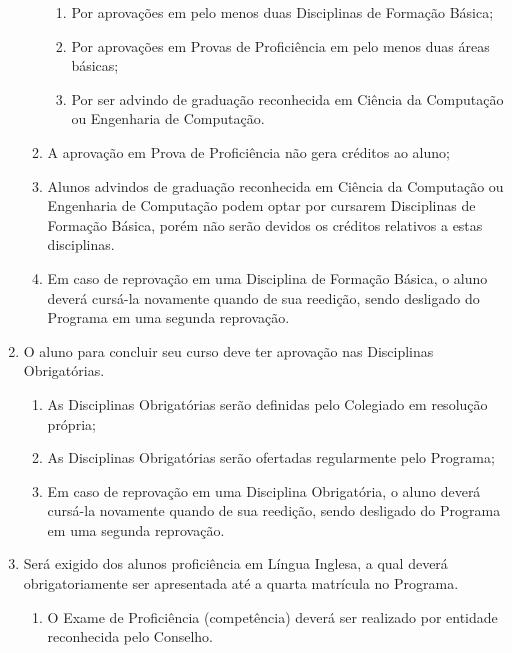 \documentclass{article}
\newcommand{\singleitem}{\item[Parágrafo Único.]}
\newcommand{\grupoMenor}{Colegiado\xspace}
\newcommand{\grupoMaior}{Conselho\xspace}
\begin{document}
\begin{enumerate}
\begin{enumerate}
		\begin{enumerate}[label=\Roman*]
			\item Por aprovações em pelo menos duas Disciplinas de Formação Básica;
			\item Por aprovações em Provas de Proficiência em pelo menos duas áreas básicas; 
			\item Por ser advindo de graduação reconhecida em Ciência da Computação ou Engenharia de Computação.
		\end{enumerate}

		\item A aprovação em Prova de Proficiência não gera créditos ao aluno;

		\item Alunos advindos de graduação reconhecida em Ciência da Computação ou Engenharia de Computação podem optar por cursarem Disciplinas de Formação Básica, porém não serão devidos os créditos relativos a estas disciplinas.

		\item Em caso de reprovação em uma Disciplina de Formação Básica, o aluno deverá cursá-la novamente quando de sua reedição, sendo desligado do Programa em uma segunda reprovação.
	\end{enumerate}

	\item O aluno para concluir seu curso deve ter aprovação nas Disciplinas Obrigatórias.
	\begin{enumerate}
		\item As Disciplinas Obrigatórias serão definidas pelo \grupoMenor em resolução própria;
		\item As Disciplinas Obrigatórias serão ofertadas regularmente pelo Programa;
		\item Em caso de reprovação em uma Disciplina Obrigatória, o aluno deverá cursá-la novamente quando de sua reedição, sendo desligado do Programa em uma segunda reprovação.
	\end{enumerate}

	\item Será exigido dos alunos proficiência em Língua Inglesa, a qual deverá obrigatoriamente ser apresentada até a quarta matrícula no Programa.
	\begin{enumerate}
		\singleitem O Exame de Proficiência (competência) deverá ser realizado por entidade reconhecida pelo \grupoMaior.
	\end{enumerate}

\end{enumerate}
\end{document}
